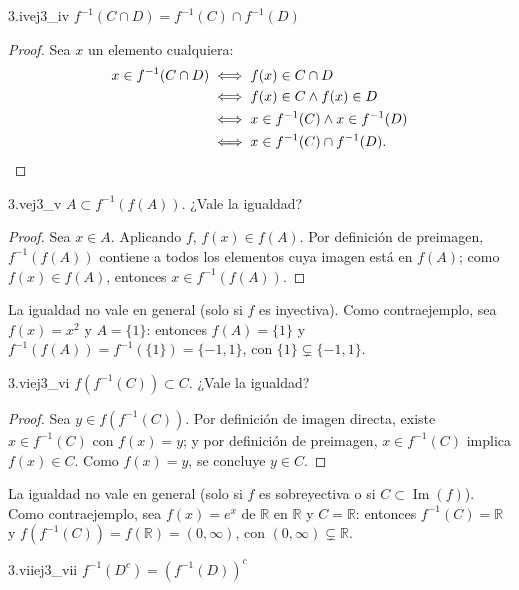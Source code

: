 \documentclass[11pt, a4paper]{article}
\begin{document}
\begin{proposicion}{3.iv}{ej3_iv}
$f^{-1}(C\cap D)=f^{-1}(C)\cap f^{-1}(D)$
\end{proposicion}

\begin{proof}
Sea $x$ un elemento cualquiera:
\begin{align*}
x \in f^{-1}(C \cap D) &\iff f(x) \in C \cap D \\
&\iff f(x) \in C \land f(x) \in D \\
&\iff x \in f^{-1}(C) \land x \in f^{-1}(D) \\
&\iff x \in f^{-1}(C) \cap f^{-1}(D). \qedhere
\end{align*}
\end{proof}

\begin{proposicion}{3.v}{ej3_v}
$A\subset f^{-1}(f(A))$. ¿Vale la igualdad?
\end{proposicion}

\begin{proof}
Sea $x \in A$. Aplicando $f$, $f(x) \in f(A)$. Por definición de preimagen, $f^{-1}(f(A))$ contiene
a todos los elementos cuya imagen está en $f(A)$; como $f(x) \in f(A)$, entonces $x \in f^{-1}(f(A))$.
\end{proof}

La igualdad no vale en general (solo si $f$ es inyectiva). Como contraejemplo, sea $f(x) = x^2$ y
$A = \{1\}$: entonces $f(A) = \{1\}$ y $f^{-1}(f(A)) = f^{-1}(\{1\}) = \{-1, 1\}$, con
$\{1\} \subsetneq \{-1, 1\}$.

\begin{proposicion}{3.vi}{ej3_vi}
$f(f^{-1}(C))\subset C$. ¿Vale la igualdad?
\end{proposicion}

\begin{proof}
Sea $y \in f(f^{-1}(C))$. Por definición de imagen directa, existe $x \in f^{-1}(C)$ con $f(x) = y$;
y por definición de preimagen, $x \in f^{-1}(C)$ implica $f(x) \in C$. Como $f(x) = y$, se concluye
$y \in C$.
\end{proof}

La igualdad no vale en general (solo si $f$ es sobreyectiva o si $C \subset \operatorname{Im}(f)$).
Como contraejemplo, sea $f(x) = e^x$ de $\mathbb{R}$ en $\mathbb{R}$ y $C = \mathbb{R}$: entonces
$f^{-1}(C) = \mathbb{R}$ y $f(f^{-1}(C)) = f(\mathbb{R}) = (0, \infty)$, con
$(0, \infty) \subsetneq \mathbb{R}$.

\begin{proposicion}{3.vii}{ej3_vii}
$f^{-1}(D^c) = (f^{-1}(D))^c$
\end{proposicion}
\end{document}
